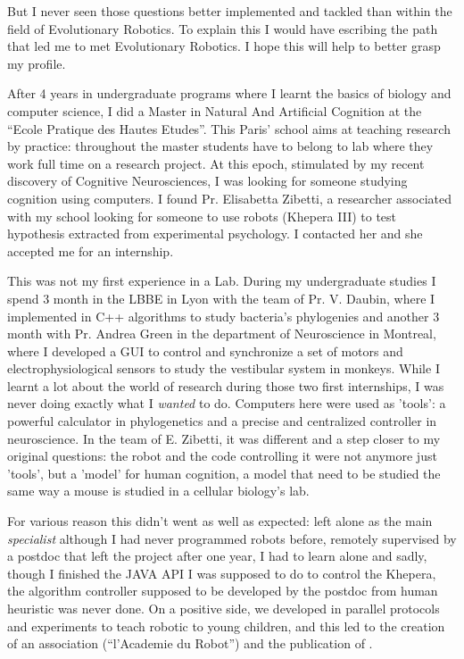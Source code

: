 \documentclass[10pt]{article}
\begin{document}
But I never seen those questions better implemented and tackled than within the field of Evolutionary Robotics. To explain this I would have escribing the path that led me to met Evolutionary Robotics. I hope this  will help to better grasp my profile.

After 4 years in undergraduate programs where I learnt the basics of biology and computer science, I did a Master in Natural And Artificial Cognition at the ``Ecole Pratique des Hautes Etudes''. This Paris' school aims at teaching research by practice: throughout the master students have to belong to lab where they work full time on a research project. At this epoch, stimulated by my recent discovery of Cognitive Neurosciences, I was looking for someone studying cognition using computers. I found Pr. Elisabetta Zibetti, a researcher associated with my school looking for someone to use robots (Khepera III) to test hypothesis extracted from experimental psychology. I contacted her and she accepted me for an internship.

This was not my first experience in a Lab. During my undergraduate studies I spend 3 month in the LBBE in Lyon with the team of Pr. V. Daubin, where I implemented in C++ algorithms to study bacteria's phylogenies and another 3 month with Pr. Andrea Green in the department of Neuroscience in Montreal, where I developed a GUI to control and synchronize a set of motors and electrophysiological sensors to study the vestibular system in monkeys.  While I learnt a lot about the world of research during those two first internships, I was never doing exactly what I \emph{wanted} to do. Computers here were used as 'tools': a powerful calculator in phylogenetics and a precise and centralized controller in neuroscience. In the team of E. Zibetti, it was different and a step closer to my original questions: the robot and the code controlling it were not anymore just 'tools', but a 'model' for human cognition, a model that need to be studied the same way a mouse is studied in a cellular biology's lab.

For various reason this didn't went as well as expected: left alone as the main \emph{specialist} although I had never programmed robots before, remotely supervised by a postdoc that left the project after one year, I had to learn alone and sadly, though I finished the JAVA API I was supposed to do to control the Khepera, the algorithm controller supposed to be developed by the postdoc from human heuristic was never done. On a positive side, we developed in parallel protocols and experiments to teach robotic to young children, and this led to the creation of an association (``l'Academie du Robot'') and the publication of \cite{gaudiello2010representations}.
\end{document}
